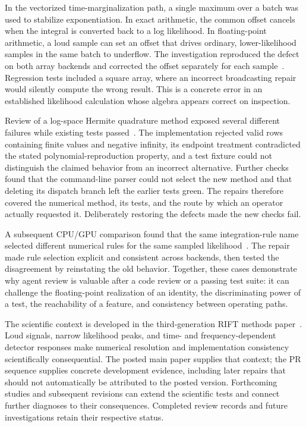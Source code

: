 \documentclass[aps,prd,reprint,nofootinbib]{revtex4-2}
\begin{document}
In the vectorized time-marginalization path, a single maximum over a batch was used to stabilize exponentiation. In exact arithmetic, the common offset cancels when the integral is converted back to a log likelihood. In floating-point arithmetic, a loud sample can set an offset that drives ordinary, lower-likelihood samples in the same batch to underflow. The investigation reproduced the defect on both array backends and corrected the offset separately for each sample~\cite{RIFTBatch}. Regression tests included a square array, where an incorrect broadcasting repair would silently compute the wrong result. This is a concrete error in an established likelihood calculation whose algebra appears correct on inspection.

Review of a log-space Hermite quadrature method exposed several different failures while existing tests passed~\cite{RIFTHermite}. The implementation rejected valid rows containing finite values and negative infinity, its endpoint treatment contradicted the stated polynomial-reproduction property, and a test fixture could not distinguish the claimed behavior from an incorrect alternative. Further checks found that the command-line parser could not select the new method and that deleting its dispatch branch left the earlier tests green. The repairs therefore covered the numerical method, its tests, and the route by which an operator actually requested it. Deliberately restoring the defects made the new checks fail.

A subsequent CPU/GPU comparison found that the same integration-rule name selected different numerical rules for the same sampled likelihood~\cite{RIFTBackend}. The repair made rule selection explicit and consistent across backends, then tested the disagreement by reinstating the old behavior. Together, these cases demonstrate why agent review is valuable after a code review or a passing test suite: it can challenge the floating-point realization of an identity, the discriminating power of a test, the reachability of a feature, and consistency between operating paths.

The scientific context is developed in the third-generation RIFT methods paper~\cite{RIFTThreeG}. Loud signals, narrow likelihood peaks, and time- and frequency-dependent detector responses make numerical resolution and implementation consistency scientifically consequential. The posted main paper supplies that context; the PR sequence supplies concrete development evidence, including later repairs that should not automatically be attributed to the posted version. Forthcoming studies and subsequent revisions can extend the scientific tests and connect further diagnoses to their consequences. Completed review records and future investigations retain their respective status.
\end{document}
